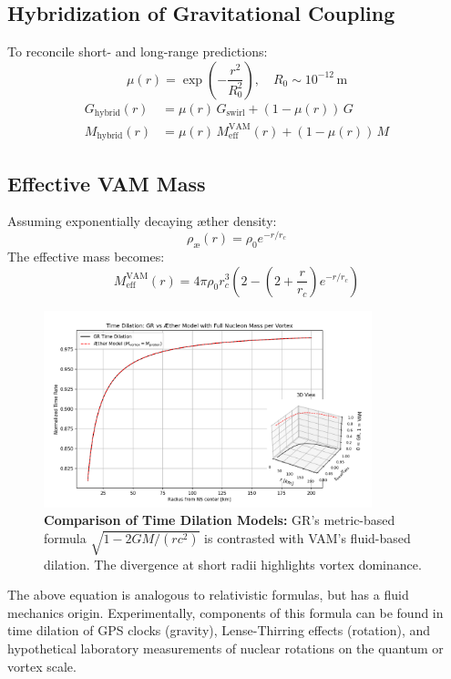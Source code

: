 \subsection{Hybridization of Gravitational Coupling}
To reconcile short- and long-range predictions:
\[
    \mu(r) = \exp\left(-\frac{r^2}{R_0^2}\right), \quad R_0 \sim 10^{-12} \, \mathrm{m}
\]
\begin{align*}
    G_{\text{hybrid}}(r) &= \mu(r) \, G_{\text{swirl}} + (1 - \mu(r)) \, G \\
    M_{\text{hybrid}}(r) &= \mu(r) \, M_\text{eff}^\text{VAM}(r) + (1 - \mu(r)) \, M
\end{align*}

\subsection{Effective VAM Mass}
Assuming exponentially decaying \ae{}ther density:
\[
    \rho_\text{\ae}(r) = \rho_0 e^{-r / r_c}
\]
The effective mass becomes:
\[
    M_\text{eff}^\text{VAM}(r) = 4\pi \rho_0 r_c^3 \left(2 - \left(2 + \frac{r}{r_c} \right) e^{-r/r_c} \right)
\]

\begin{figure}[H]
    \centering
    \includegraphics[width=0.85\textwidth]{images/07-TimeDilationGRVsVAM}
    \caption{\textbf{Comparison of Time Dilation Models:} GR's metric-based formula $\sqrt{1 - 2GM/(rc^2)}$ is contrasted with VAM's fluid-based dilation. The divergence at short radii highlights vortex dominance.}
    \label{fig:GRvsVAMTimeDilation}
\end{figure}


The above equation is analogous to relativistic formulas, but has a fluid mechanics origin. Experimentally, components of this formula can be found in time dilation of GPS clocks (gravity), Lense-Thirring effects (rotation), and hypothetical laboratory measurements of nuclear rotations on the quantum or vortex scale.

